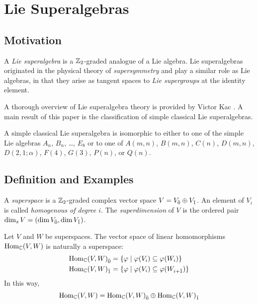 \chapter{Lie Superalgebras}
\label{chap:lsa}

\section{Motivation}
\label{sec:motivate-lsa}

A \emph{Lie superalgebra} is a $\mathbb{Z}_2$-graded analogue of a Lie algebra. Lie superalgebras originated in the physical theory of \emph{supersymmetry} and play a similar role as Lie algebras, in that they arise as tangent spaces to \emph{Lie supergroups} at the identity element.

A thorough overview of Lie superalgebra theory is provided by Victor Kac \cite{Kac}. A main result of this paper is the classification of simple classical Lie superalgebras.

\begin{theorem}
  A simple classical Lie superalgebra is isomorphic to either to one of the simple Lie algebras $A_n$, $B_n$, \ldots, $E_8$ or to one of $A(m,n)$, $B(m,n)$, $C(n)$, $D(m,n)$, $D(2,1;\alpha)$, $F(4)$, $G(3)$, $P(n)$, or $Q(n)$.
\end{theorem}

\section{Definition and Examples}

\begin{definition}
  A \emph{superspace} is a $\mathbb{Z}_2$-graded complex vector space $V = {V}_{\bar{0}} \oplus {V}_{\bar{1}}$. An element of $V_i$ is called \emph{homogenous of degree $i$}. The \emph{superdimension} of $V$ is the ordered pair $\dim_s V = (\dim {V}_{\bar{0}}, \dim {V}_{\bar{1}})$.
\end{definition}

\begin{example} \label{ex:hom}
  Let $V$ and $W$ be superspaces. The vector space of linear homomorphisms $\operatorname{Hom}_{\mathbb{C}}(V,W)$ is naturally a superspace:
  \begin{align*}
    {\operatorname{Hom}_{\mathbb{C}}(V,W)}_{\bar{0}} &= \{ \varphi \mid \varphi(V_i) \subseteq \varphi(W_i)\} \\
    {\operatorname{Hom}_{\mathbb{C}}(V,W)}_{\bar{1}} &= \{ \varphi \mid \varphi(V_i) \subseteq \varphi(W_{i + \bar 1})\}
  \end{align*}
  In this way,
  \[
    \operatorname{Hom}_{\mathbb{C}}(V,W) = {\operatorname{Hom}_{\mathbb{C}}(V,W)}_{\bar{0}} \oplus {\operatorname{Hom}_{\mathbb{C}}(V,W)}_{\bar{1}}
  \]
  
\end{example}

